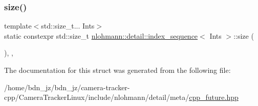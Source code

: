 \subsubsection{\texorpdfstring{size()}{size()}}
{\footnotesize\ttfamily template$<$std\+::size\+\_\+t... Ints$>$ \\
static constexpr std\+::size\+\_\+t \hyperlink{structnlohmann_1_1detail_1_1index__sequence}{nlohmann\+::detail\+::index\+\_\+sequence}$<$ Ints $>$\+::size (\begin{DoxyParamCaption}{ }\end{DoxyParamCaption})\hspace{0.3cm}{\ttfamily [inline]}, {\ttfamily [static]}, {\ttfamily [noexcept]}}



The documentation for this struct was generated from the following file\+:\begin{DoxyCompactItemize}
\item 
/home/bdn\+\_\+jz/bdn\+\_\+jz/camera-\/tracker-\/cpp/\+Camera\+Tracker\+Linux/include/nlohmann/detail/meta/\hyperlink{cpp__future_8hpp}{cpp\+\_\+future.\+hpp}\end{DoxyCompactItemize}

